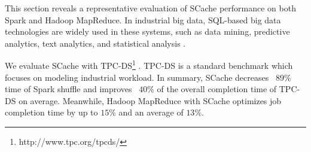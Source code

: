 {\color{black}
This section reveals a representative evaluation of SCache performance on both Spark and Hadoop MapReduce.
In industrial big data, SQL-based big data technologies are widely used in these systems, such as data mining, predictive analytics, text analytics, and statistical analysis \cite{poess2017analysis}.

We  evaluate SCache with TPC-DS\footnote{http://www.tpc.org/tpcds/} .
TPC-DS is a standard benchmark which focuses on modeling industrial workload.
In summary, SCache decreases ~$89\%$ time of Spark shuffle and improves ~$40\%$ of the overall completion time of TPC-DS on average.
Meanwhile, Hadoop MapReduce with SCache optimizes job completion time by up to $15\%$ and an average of $13\%$.
}


